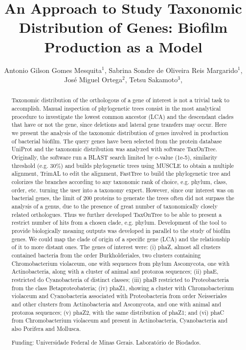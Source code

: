 \documentclass[twoside]{article}
\title{\vspace{-15mm}\fontsize{24pt}{10pt}\selectfont\textbf{ An Approach to Study Taxonomic Distribution of Genes: Biofilm Production as a Model }} %
\author{ Antonio Gilson Gomes Mesquita$^{1}$, Sabrina Sondre de Oliveira Reis Margarido$^{1}$, José Miguel Ortega$^{2}$, Tetsu Sakamoto$^{3}$, }
\affil{ 1 Universidade Federal do Acre, LabGenMol

2 Universidade Federal de Minas Gerais, Laboratório de Biodados

3 Universidade Federal de Minas Gerais. Laboratório de Biodados

 }
\date{}
\begin{document}
  
  
  \maketitle %
  
  
  \thispagestyle{fancy} %
  
  
  \begin{abstract}
  Taxonomic distribution of the orthologous of a gene of interest is not a trivial task to accomplish. Manual inspection of phylogenetic trees consist in the most analytical procedure to investigate the lowest common ancestor (LCA) and the descendant clades that have or not the gene, since deletions and lateral gene transfers may occur. Here we present the analysis of the taxonomic distribution of genes involved in production of bacterial biofilm. The query genes have been selected from the protein database UniProt and the taxonomic distribution was analyzed with software TaxOnTree. Originally, the software run a BLAST search limited by e-value (1e-5), similarity threshold (e.g. 30\%) and builds phylogenetic trees using MUSCLE to obtain a multiple alignment, TrimAL to edit the alignment, FastTree to build the phylogenetic tree and colorizes the branches according to any taxonomic rank of choice, e.g. phylum, class, order, etc. turning the user into a taxonomy expert. However, since our interest was on bacterial genes, the limit of 200 proteins to generate the trees often did not surpass the analysis of a genus, due to the presence of great number of taxonomically closely related orthologues. Thus we further developed TaxOnTree to be able to present a restrict number of hits from a chosen clade, e.g. phylum. Development of the tool to provide biologically meaning outputs was developed in parallel to the study of biofilm genes. We could map the clade of origin of a specific gene (LCA) and the relationship of it to more distant ones. The genes of interest were: (i) phaZ, almost all clusters contained bacteria from the order Burkholderiales, two clusters containing Chromobacterium violaceum, one with sequences from phylum Ascomycota, one with Actinobacteria, along with a cluster of animal and protozoa sequences; (ii) phaE, restricted do Cyanobacteria of distinct classes; (iii) phaB restricted to Proteobacteria from the class Betaproteobateria; (iv) phaZ1, showing a cluster with Chromobacterium violaceum and Cyanobacteria associated with Proteobacteria from order Neisseriales and other clusters from Actinobacteria and Ascomycota, and one with animal and protozoa sequences; (v) phaZ2, with the same distribution of phaZ1; and (vi) phaC from Chromobacterium violaceum and present in Actinobacteria, Cyanobacteria and also Porifera and Mollusca.
  
  Funding: Universidade Federal de Minas Gerais. Laborat\'orio de Biodados. \\ 
  \end{abstract}
  
\end{document}
